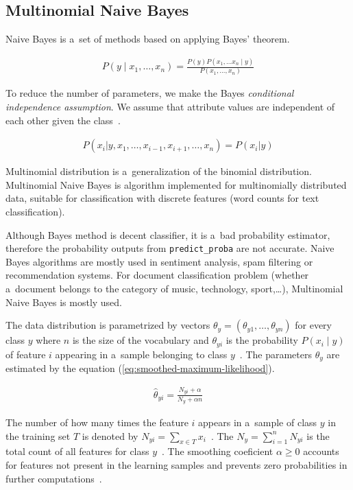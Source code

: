\subsection{Multinomial Naive Bayes}\label{subsec:multinomial-naive-bayes}

Naive Bayes is a~set of methods based on applying Bayes' theorem.

\begin{align}
    P(y \mid x_1, \dots, x_n) = \frac{P(y) P(x_1, \dots x_n \mid y)}{P(x_1, \dots, x_n)}
\end{align}

To reduce the number of parameters, we make the  Bayes \textit{conditional independence assumption}.
We assume that attribute values are independent of each other given the class~\cite{book:introduction-to-information-retrieval}.

\begin{align}
    P(x_i | y, x_1, \dots, x_{i-1}, x_{i+1}, \dots, x_n) = P(x_i | y)
\end{align}

Multinomial distribution is a~generalization of the binomial distribution.
Multinomial Naive Bayes is algorithm implemented for multinomially distributed data, suitable for classification with discrete features (word counts for text classification).

Although Bayes method is decent classifier, it is a~bad probability estimator, therefore the probability outputs from \verb|predict_proba| are not accurate.
Naive Bayes algorithms are mostly used in sentiment analysis, spam filtering or recommendation systems.
For document classification problem (whether a~document belongs to the category of music, technology, sport,\ldots), Multinomial Naive Bayes is mostly used.

The data distribution is parametrized by vectors \( \theta_y = (\theta_{y1},\ldots,\theta_{yn}) \) for every class \( y \) where \( n \) is the size of the vocabulary and \( \theta_{yi} \) is the probability \( P(x_i \mid y) \) of feature \( i \) appearing in a~sample belonging to class \( y \)~\cite{scikit-learn}.
The parameters \( \theta_y \) are estimated by the equation (\ref{eq:smoothed-maximum-likelihood}).

\begin{align}
    \hat{\theta}_{yi} = \frac{ N_{yi} + \alpha}{N_y + \alpha n} \label{eq:smoothed-maximum-likelihood}
\end{align}

The number of how many times the feature \( i \) appears in a~sample of class \( y \) in the training set \( T \) is denoted by \( N_{yi} = \sum_{x \in T} x_i \)~\cite{scikit-learn}.
The \( N_{y} = \sum_{i=1}^{n} N_{yi} \) is the total count of all features for class \( y \)~\cite{scikit-learn}.
The smoothing coeficient \( \alpha \ge 0 \) accounts for features not present in the learning samples and prevents zero probabilities in further computations~\cite{scikit-learn}.


